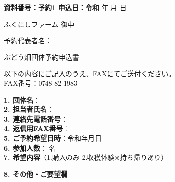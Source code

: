 \documentclass[a4paper,11pt]{jlreq}
\begin{document}
\noindent
\textbf{資料番号：予約1} \hfill \textbf{申込日：令和} \hrulefill{} 年 \hrulefill{} 月 \hrulefill{} 日

\vspace{2em}

\noindent
ふくにしファーム 御中

\vspace{2em}

\begin{flushright}
予約代表者名：\underline{\hspace{5cm}}\\
\end{flushright}

\vspace{3em}

\begin{center}
{\LARGE ぶどう畑団体予約申込書}
\end{center}

\vspace{3em}

\noindent
以下の内容にご記入のうえ、FAXにてご送付ください。\\
FAX番号：0748-82-1983

\vspace{1em}

\noindent
\textbf{1. 団体名}：\underline{\hspace{11cm}}\\

\noindent
\textbf{2. 担当者氏名}：\underline{\hspace{10cm}}\\

\noindent
\textbf{3. 連絡先電話番号}：\underline{\hspace{10cm}}\\

\noindent
\textbf{4. 返信用FAX番号}：\underline{\hspace{10cm}}\\

\noindent
\textbf{5. ご予約希望日時}：令和\underline{\hspace{1cm}}年\underline{\hspace{1cm}}月\underline{\hspace{1cm}}日\\

\noindent
\textbf{6. 参加人数}：\underline{\hspace{3cm}} 名\\[0.5em]

\noindent
\textbf{7. 希望内容}（1.購入のみ    2.収穫体験※持ち帰りあり）\underline{\hspace{3cm}}\\


\vspace{1em}

\noindent
\textbf{8. その他・ご要望欄}\\
\fbox{
  \parbox[t][5em][t]{\textwidth}{\strut\vspace{3em}}%
}
\end{document}
